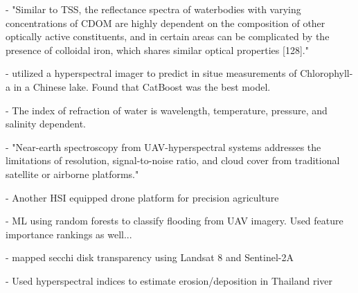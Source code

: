 \documentclass[journal,article,submit,pdftex,moreauthors]{Definitions/mdpi}
\begin{document}
- \cite{topp2020research} "Similar to TSS, the reflectance spectra of waterbodies with varying concentrations of CDOM are highly dependent on the composition of other optically active constituents, and in certain areas can be complicated by the presence of colloidal iron, which shares similar optical properties [128]."


- \cite{lu2021retrieval} utilized a hyperspectral imager to predict in situe measurements of Chlorophyll-a in a Chinese lake. Found that CatBoost was the best model.


- \cite{austin1976index} The index of refraction of water is wavelength, temperature, pressure, and salinity dependent.


-\cite{banerjee2020uav} "Near-earth spectroscopy from UAV-hyperspectral systems addresses the limitations of resolution, signal-to-noise ratio, and cloud cover from traditional satellite or airborne platforms."

-\cite{kurihara2020unmanned} Another HSI equipped drone platform for precision agriculture

-\cite{feng2015urban} ML using random forests to classify flooding from UAV imagery. Used feature importance rankings as well...

-\cite{bonansea2019using} mapped secchi disk transparency using Landsat 8 and Sentinel-2A

-\cite{laonamsai2023utilizing} Used hyperspectral indices to estimate erosion/deposition in Thailand river


\end{document}
